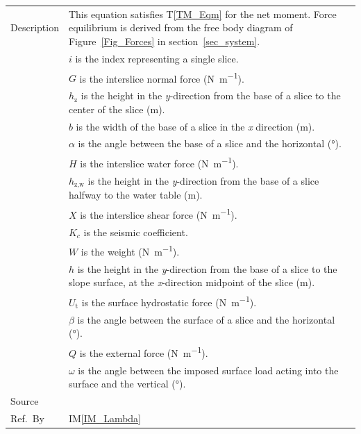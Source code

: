 \documentclass[12pt]{article}
\newcommand{\colAwidth}{0.13\textwidth}
\newcommand{\colBwidth}{0.82\textwidth}
\newcommand{\tref}[1]{T\ref{#1}}
\newcommand{\iref}[1]{IM\ref{#1}}
\begin{document}
\begin{minipage}{\textwidth}
\begin{tabular}{| p{\colAwidth} | p{\colBwidth}|}
 \hline Description & This equation satisfies \tref{TM_Eqm} for the net moment. 
 Force equilibrium is derived from the free body diagram of 
 Figure~\ref{Fig_Forces} in section~\ref{sec_system}.\\
 &$i$ is the index representing a single slice.\\
 &$G$ is the interslice normal force (\si{\newton\per\meter}). \\
 &$h_\text{z}$ is the height in the \textit{y}-direction from the base of a 
 slice to the center of the slice (\si{\meter}).\\
 &$b$ is the width of the base of a slice in the \textit{x} direction 
 (\si{\meter}).\\
 &$\alpha$ is the angle between the base of a slice and the 
 horizontal (\si{\degree}). \\
 &$H$ is the interslice water force (\si{\newton\per\meter}). \\
 &$h_\text{z,w}$ is the height in the \textit{y}-direction from the base of a 
 slice halfway to the water table (\si{\meter}).\\
 &$X$ is the interslice shear force (\si{\newton\per\meter}). \\
 &$K_c$ is the seismic coefficient. \\
 &$W$ is the weight (\si{\newton\per\meter}). \\
 &$h$ is the height in the \textit{y}-direction from the base of a slice 
 to the slope surface, at the \textit{x}-direction midpoint of the slice 
 (\si{\meter}).\\
 &$U_\text{t}$ is the surface hydrostatic force (\si{\newton\per\meter}). \\
 &$\beta$ is the angle between the surface of a slice and the 
 horizontal (\si{\degree}). \\
 &$Q$ is the external force (\si{\newton\per\meter}). \\
 &$\omega$ is the angle between the imposed surface load acting into 
 the surface and the vertical (\si{\degree}). \\

  \hline Source & \cite{ZhuEtAl2005}\\
  
  \hline Ref.\ By & \iref{IM_Lambda}\\
  
  \hline
\end{tabular}
\end{minipage}\\
\end{document}
